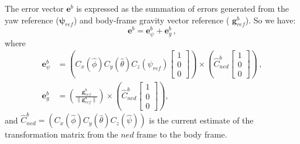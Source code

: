 \documentclass[journal]{IEEEtran}
\begin{document}
The error vector $\boldsymbol{e}^b$ is expressed as the summation of errors generated from the yaw reference ($\boldsymbol{\psi}_{ref}$) and body-frame gravity vector reference ( $\boldsymbol{g}_{ref}^b$).
So we have:
\begin{equation}
    \boldsymbol{e}^b= \boldsymbol{e}_\psi^b+\boldsymbol{e}_g^b\,,
\end{equation}
where
\begin{equation}\label{eq_hjl}
\begin{split}
   \boldsymbol{e}_\psi^b&=\left(C_x(\hat{\phi})C_y(\hat{\theta})C_z({\psi}_{ref}) \begin{bmatrix}
   1\\
   0\\
   0
   \end{bmatrix}
   \right)\times\left( \hat{C}_{ned}^b \begin{bmatrix}
   1\\
   0\\
   0
   \end{bmatrix}\right)\,,\\[1em]
   \boldsymbol{e}_g^b&= \left(\frac{\boldsymbol{g}_{ref}^b}{\|\boldsymbol{g}_{ref}^b\|} \right)\times\left( \hat{C}_{ned}^b \begin{bmatrix}
   1\\
   0\\
   0
   \end{bmatrix}\right),
   \end{split}
\end{equation}
and $\hat{C}_{ned}^b=\left(C_x(\hat{\phi})C_y(\hat{\theta})C_z({\hat{\psi}})\right)$ is the current estimate of the transformation matrix from the $ned$ frame to the body frame.\par
\end{document}

